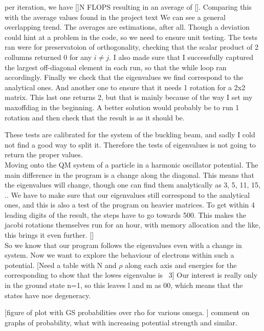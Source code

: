 \documentclass[10pt, twocolumn]{article}
\begin{document}
per iteration, we have []N FLOPS resulting in an average of []. Comparing this with the average values 
found in the project text %
We can see a general overlapping trend. The averages are estimations, after all. Though a deviation 
could hint at a problem in the code, so we need to ensure unit testing. The tests ran were for
preservatoion of orthogonality, checking that the scalar product of 2 collumns returned 0 for any $i \neq j$.
I also made sure that I successfully captured the largest off-diagonal element in each run, so that the while loop 
ran accordingly. 
Finally we check that the eigenvalues we find correspond to the analytical ones. And another one to ensure that it
needs 1 rotation for a 2x2 matrix. This last one returns 2, but that is mainly because of the way I set my maxoffdiag 
in the beginning. A better solution would probably be to run 1  rotation and then check that the result is as it should be. 

These tests are calibrated for the system of the buckling beam, and sadly I cold not find a good way to split it. Therefore the tests of eigenvalues is not going to return the proper values.\\

Moving onto the QM system of a particle in a harmonic oscillator potential. The main difference in the program is a change along the diagonal. 
This means that the eigenvalues will change, though one can find them analytically as 3, 5, 11, 15, .. %
We have to make sure that our eigenvalues still correspond to the analytical ones, and this is also a test of the program on heavier matrices. 
To get within 4 leading digits of the result, the steps have to go towards 500. This makes the jacobi rotations themselves run for an hour, 
with memory allocation and the like, this brings it even further. []\\

So we know that our program follows the eigenvalues even with a change in system.
Now we want to explore the behaviour of electrons within such a 
potential.  [Need a table with N and $\rho$ along each axis and energies for the corresponding to show that the lowes eigenvalue is ~3]
Our interest is really only in the ground state n=1, so this leaves l and m as 00, which means that the states have noe degeneracy. 

[figure of plot with GS probabilities over rho for various omega. ]
comment on graphs of probability, what with increasing potential strength and similar. 
\end{document}
